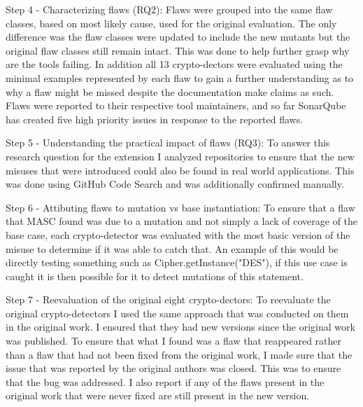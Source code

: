 Step 4 - Characterizing flaws (RQ2): Flaws were grouped into the same flaw classes, based on most likely cause, used for the original evaluation. The only difference was the flaw classes were updated to include the new mutants but the original flaw classes still remain intact. This was done to help further grasp why are the tools failing. In addition all 13 crypto-dectors were evaluated using the minimal examples represented by each flaw to gain a further understanding as to why a flaw might be missed despite the documentation make claims as such. Flaws were reported to their respective tool maintainers, and so far SonarQube has created five high priority issues in response to the reported flaws.

Step 5 - Understanding the practical impact of flaws (RQ3): To answer this research question for the extension I analyzed repositories to ensure that the new misuses that were introduced could also be found in real world applications. This was done using GitHub Code Search and was additionally confirmed manually.

Step 6 - Attibuting flaws to mutation vs base instantiation: To ensure that a flaw that MASC found was due to a mutation and not simply a lack of coverage of the base case, each crypto-detector was evaluated with the most basic version of the misuse to determine if it was able to catch that. An example of this would be directly testing something such as Cipher.getInstance("DES"), if this use case is caught it is then possible for it to detect mutations of this statement.

Step 7 - Reevaluation of the original eight crypto-dectors: To reevaluate the original crypto-detectors I used the same approach that was conducted on them in the original work. I ensured that they had new versions since the original work was published. To ensure that what I found was a flaw that reappeared rather than a flaw that had not been fixed from the original work, I made sure that the issue that was reported by the original authors was closed. This was to ensure that the bug was addressed. I also report if any of the flaws present in the original work that were never fixed are still present in the new version.